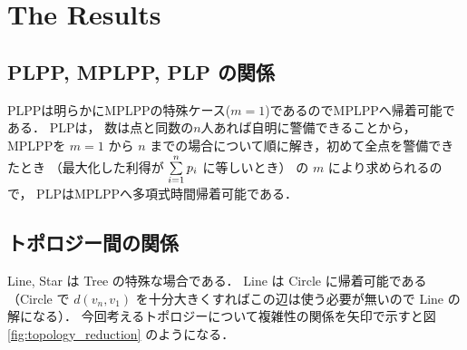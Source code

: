






\section{The Results}


\subsection{PLPP, MPLPP, PLP の関係}
PLPPは明らかにMPLPPの特殊ケース($m = 1$)であるのでMPLPPへ帰着可能である．
PLPは，
\server 数は点と同数の$n$人あれば自明に警備できることから，
MPLPPを $m = 1$ から $n$ までの場合について順に解き，初めて全点を警備できたとき
（最大化した利得が $\sum\limits_{i = 1}^n p_i$ に等しいとき）
の $m$ により求められるので，
PLPはMPLPPへ多項式時間帰着可能である．



\subsection{トポロジー間の関係}
Line, Star は Tree の特殊な場合である．
Line は Circle に帰着可能である
（Circle で $d(v_n,v_1)$ を十分大きくすればこの辺は使う必要が無いので Line の解になる）．
今回考えるトポロジーについて複雑性の関係を矢印で示すと図\ref{fig:topology_reduction}
のようになる．

